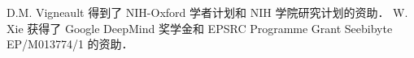D.M. Vigneault 得到了 NIH-Oxford 学者计划和 NIH 学院研究计划的资助．
W. Xie 获得了 Google DeepMind 奖学金和 EPSRC Programme Grant Seebibyte EP/M013774/1 的资助．
